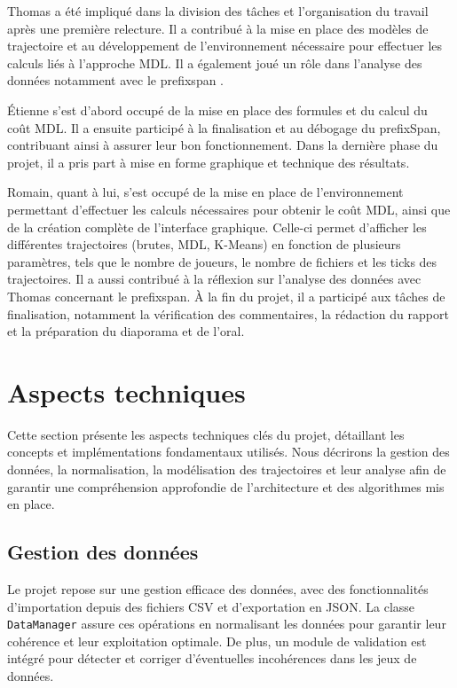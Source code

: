 \documentclass{article}
\begin{document}
        Thomas a été impliqué dans la division des tâches et l'organisation du travail après une première relecture. Il a contribué à la mise en place des modèles de trajectoire et au développement de l’environnement nécessaire pour effectuer les calculs liés à l’approche MDL. Il a également joué un rôle dans l’analyse des données notamment avec le prefixspan .
        
        Étienne s’est d’abord occupé de la mise en place des formules et du calcul du coût MDL. Il a ensuite participé à la finalisation et au débogage du prefixSpan, contribuant ainsi à assurer leur bon fonctionnement. Dans la dernière phase du projet, il a pris part à mise en forme graphique et technique des résultats.
        
        Romain, quant à lui, s'est occupé de la mise en place de l’environnement permettant d’effectuer les calculs nécessaires pour obtenir le coût MDL, ainsi que de la création complète de l'interface graphique. Celle-ci permet d'afficher les différentes trajectoires (brutes, MDL, K-Means) en fonction de plusieurs paramètres, tels que le nombre de joueurs, le nombre de fichiers et les ticks des trajectoires. Il a aussi contribué à la réflexion sur l’analyse des données avec Thomas concernant le prefixspan. À la fin du projet, il a participé aux tâches de finalisation, notamment la vérification des commentaires, la rédaction du rapport et la préparation du diaporama et de l’oral.

    \section{Aspects techniques}

        Cette section présente les aspects techniques clés du projet, détaillant les concepts et implémentations fondamentaux utilisés. Nous décrirons la gestion des données, la normalisation, la modélisation des trajectoires et leur analyse afin de garantir une compréhension approfondie de l'architecture et des algorithmes mis en place.
        
        \subsection{Gestion des données}
        Le projet repose sur une gestion efficace des données, avec des fonctionnalités d'importation depuis des fichiers CSV et d'exportation en JSON. La classe \texttt{DataManager} assure ces opérations en normalisant les données pour garantir leur cohérence et leur exploitation optimale. De plus, un module de validation est intégré pour détecter et corriger d'éventuelles incohérences dans les jeux de données.
        
\end{document}
